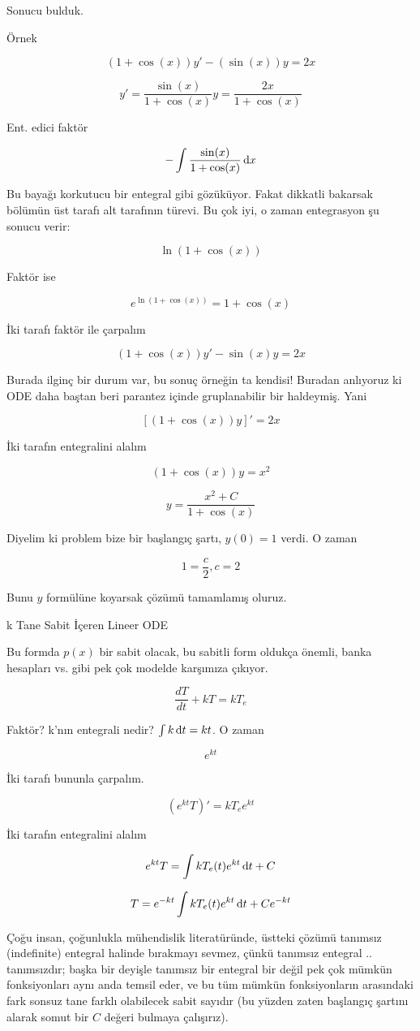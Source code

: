 \documentclass[12pt,fleqn]{article}\usepackage{../../common}
\begin{document}
Sonucu bulduk.

Örnek 

$$ (1+\cos(x))y' - (\sin(x))y = 2x $$

$$ y' = \frac{\sin(x)}{1+\cos(x)}y = \frac{2x}{1+\cos(x)} $$

Ent. edici faktör

$$ - \int \frac{\sin(x)}{1+\cos(x)} \,\mathrm{d} x $$

Bu bayağı korkutucu bir entegral gibi gözüküyor. Fakat dikkatli bakarsak
bölümün üst tarafı alt tarafının türevi. Bu çok iyi, o zaman entegrasyon şu
sonucu verir:

$$ \ln (1+\cos(x)) $$

Faktör ise

$$ e^{\ln (1+\cos(x))} = 1+\cos(x) $$

İki tarafı faktör ile çarpalım

$$ (1+\cos(x)) y' - \sin(x)y = 2x $$

Burada ilginç bir durum var, bu sonuç örneğin ta kendisi! Buradan anlıyoruz
ki ODE daha baştan beri parantez içinde gruplanabilir bir haldeymiş. Yani

$$ [(1+\cos(x))y]' = 2x $$

İki tarafın entegralini alalım

$$ (1+\cos(x))y = x^2 $$

$$ y = \frac{x^2+C}{1+\cos(x)} $$

Diyelim ki problem bize bir başlangıç şartı, $y(0) = 1$ verdi. O zaman

$$ 1=\frac{c}{2}, c=2 $$

Bunu $y$ formülüne koyarsak çözümü tamamlamış oluruz. 

k Tane Sabit İçeren Lineer ODE

Bu formda $p(x)$ bir sabit olacak, bu sabitli form oldukça önemli, banka
hesapları vs. gibi pek çok modelde karşımıza çıkıyor.

$$ \frac{dT}{dt} + kT = kT_e $$

Faktör? k'nın entegrali nedir? $\int k \,\mathrm{d} t = kt$. O zaman

$$ e^{kt} $$

İki tarafı bununla çarpalım. 

$$ (e^{kt} T)' = kT_e e^{kt} $$

İki tarafın entegralini alalım

$$ e^{kt} T = \int kT_e(t) e^{kt} \,\mathrm{d} t + C$$

$$ T = e^{-kt} \int kT_e(t) e^{kt} \,\mathrm{d} t + C e^{-kt} $$

Çoğu insan, çoğunlukla mühendislik literatüründe, üstteki çözümü tanımsız
(indefinite) entegral halinde bırakmayı sevmez, çünkü tanımsız entegral
.. tanımsızdır; başka bir deyişle tanımsız bir entegral bir değil pek çok
mümkün fonksiyonları aynı anda temsil eder, ve bu tüm mümkün fonksiyonların
arasındaki fark sonsuz tane farklı olabilecek sabit sayıdır (bu yüzden
zaten başlangıç şartını alarak somut bir $C$ değeri bulmaya çalışırız).
\end{document}
